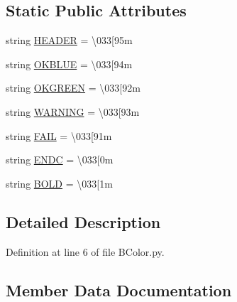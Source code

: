 \subsection*{Static Public Attributes}
\begin{DoxyCompactItemize}
\item 
string \hyperlink{class_ground_segment_1_1_utils_1_1_b_color_1_1bcolors_ac243a807bbdb4c65a3cc4462e054b6f3}{H\+E\+A\+D\+E\+R} = \textquotesingle{}\textbackslash{}033\mbox{[}95m\textquotesingle{}
\item 
string \hyperlink{class_ground_segment_1_1_utils_1_1_b_color_1_1bcolors_a4116e5b3baa62eb05489578aedf9dfc6}{O\+K\+B\+L\+U\+E} = \textquotesingle{}\textbackslash{}033\mbox{[}94m\textquotesingle{}
\item 
string \hyperlink{class_ground_segment_1_1_utils_1_1_b_color_1_1bcolors_a9d7eeaef6362cdddd1046170f2eadafc}{O\+K\+G\+R\+E\+E\+N} = \textquotesingle{}\textbackslash{}033\mbox{[}92m\textquotesingle{}
\item 
string \hyperlink{class_ground_segment_1_1_utils_1_1_b_color_1_1bcolors_a97624f8312073a262adc7eb1adca603a}{W\+A\+R\+N\+I\+N\+G} = \textquotesingle{}\textbackslash{}033\mbox{[}93m\textquotesingle{}
\item 
string \hyperlink{class_ground_segment_1_1_utils_1_1_b_color_1_1bcolors_a9cec8523e8ad132eaf3c4a6a71352bf4}{F\+A\+I\+L} = \textquotesingle{}\textbackslash{}033\mbox{[}91m\textquotesingle{}
\item 
string \hyperlink{class_ground_segment_1_1_utils_1_1_b_color_1_1bcolors_ae845b723ae62e3efb7f7a047a88d2bd7}{E\+N\+D\+C} = \textquotesingle{}\textbackslash{}033\mbox{[}0m\textquotesingle{}
\item 
string \hyperlink{class_ground_segment_1_1_utils_1_1_b_color_1_1bcolors_ab8132c269e197df88cdac8f1f8de82e1}{B\+O\+L\+D} = \textquotesingle{}\textbackslash{}033\mbox{[}1m\textquotesingle{}
\end{DoxyCompactItemize}


\subsection{Detailed Description}


Definition at line 6 of file B\+Color.\+py.



\subsection{Member Data Documentation}
\hypertarget{class_ground_segment_1_1_utils_1_1_b_color_1_1bcolors_ab8132c269e197df88cdac8f1f8de82e1}{}
